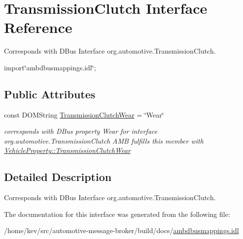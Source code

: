 \hypertarget{interfaceTransmissionClutch}{\section{Transmission\+Clutch Interface Reference}
\label{interfaceTransmissionClutch}
}


Corresponds with D\+Bus Interface org.\+automotive.\+Transmission\+Clutch.  




{\ttfamily import\char`\"{}ambdbusmappings.\+idl\char`\"{};}

\subsection*{Public Attributes}
\begin{DoxyCompactItemize}
\item 
\hypertarget{interfaceTransmissionClutch_ab8645ae72ab9dd0d586c91206e16202f}{const D\+O\+M\+String \hyperlink{interfaceTransmissionClutch_ab8645ae72ab9dd0d586c91206e16202f}{Transmission\+Clutch\+Wear} = \char`\"{}Wear\char`\"{}}\label{interfaceTransmissionClutch_ab8645ae72ab9dd0d586c91206e16202f}

\begin{DoxyCompactList}\small\item\em corresponds with D\+Bus property Wear for interface org.\+automotive.\+Transmission\+Clutch A\+M\+B fulfills this member with \hyperlink{classVehicleProperty_a4abb5cb7193d2836c49962c34f8ddc0f}{Vehicle\+Property\+::\+Transmission\+Clutch\+Wear} \end{DoxyCompactList}\end{DoxyCompactItemize}


\subsection{Detailed Description}
Corresponds with D\+Bus Interface org.\+automotive.\+Transmission\+Clutch. 

The documentation for this interface was generated from the following file\+:\begin{DoxyCompactItemize}
\item 
/home/kev/src/automotive-\/message-\/broker/build/docs/\hyperlink{ambdbusmappings_8idl}{ambdbusmappings.\+idl}\end{DoxyCompactItemize}
